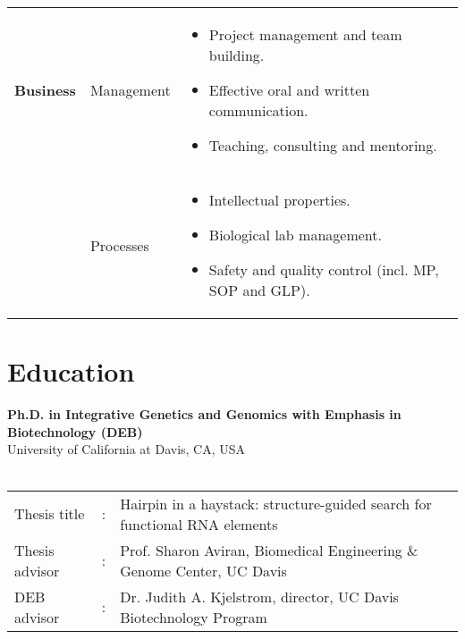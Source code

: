 \documentclass{CV}
\begin{document}
\begin{tabular}{p{} p{} p{}}
\textbf{Business} & 
	Management &
		\begin{itemize}\setlength\itemsep{-0.5em}
		\vspace{-1.8em}
		\item Project management and team building.
		\item Effective oral and written communication.
		\item Teaching, consulting and mentoring.
		\end{itemize}\\
& 
	Processes &
		\begin{itemize}\setlength\itemsep{-0.5em}
		\vspace{-1.8em}
		\item Intellectual properties.
		\item Biological lab management.
		\item Safety and quality control (incl. MP, SOP and GLP).
		\end{itemize}
\end{tabular}








\section*{Education}
\textbf{Ph.D. in  Integrative Genetics and Genomics with Emphasis in Biotechnology (DEB)}\\
University of California at Davis, CA, USA \hfill {}\\
~\\
\begin{tabular}{lcl}
    Thesis title&:&Hairpin in a haystack: structure-guided search for functional RNA elements\\
    Thesis advisor&:& Prof. Sharon Aviran, Biomedical Engineering \& Genome Center, UC Davis\\
    DEB advisor&:& Dr. Judith A. Kjelstrom, director, UC Davis Biotechnology Program\\
\end{tabular}\\
~\\
\end{document}

